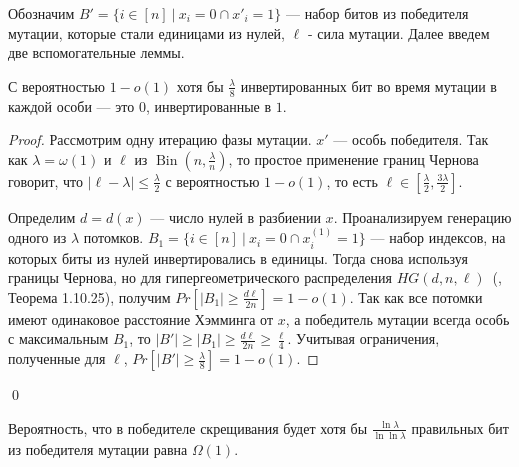 \documentclass[times]{itmo-student-thesis}
\DeclareMathOperator{\Bin}{Bin}
\begin{document}
Обозначим $B' = \{i \in [n] ~|~ x_i = 0 \cap x'_i = 1\}$ --- набор битов из победителя мутации, которые стали единицами из нулей,
$\ell$ - сила мутации. Далее введем две вспомогательные леммы.

\begin{lemma}\label{lem:mut1}
С вероятностью $1- o(1)$ хотя бы $\frac{\lambda}{8}$ инвертированных бит во время мутации в каждой особи --- это $0$, инвертированные в $1$.
\end{lemma}

\begin{proof}
Рассмотрим одну итерацию фазы мутации. $x'$ --- особь победителя.
Так как $\lambda = \omega(1)$ и $\ell$ из $\Bin\left(n, \frac{\lambda}{n}\right)$, то простое применение границ Чернова~\cite{Doerr2011} говорит, что $|\ell - \lambda| \le \frac{\lambda}{2}$ с вероятностью $1- o(1)$, то есть $\ell \in [\frac{\lambda}{2}, \frac{3\lambda}{2}]$.

Определим $d = d(x)$ --- число нулей в разбиении $x$. Проанализируем генерацию одного из $\lambda$ потомков. $B_1 = \{i \in [n] ~|~ x_i = 0 \cap x^{(1)}_i = 1\}$ --- набор индексов, на которых биты из нулей инвертировались в единицы. Тогда снова используя границы Чернова, но для гипергеометрического распределения $HG(d, n, \ell)$~(\cite{Doerr20bookchapter}, Теорема 1.10.25), получим $Pr[|B_1| \ge \frac{d\ell}{2n}] = 1 - o(1)$.
Так как все потомки имеют одинаковое расстояние Хэмминга от $x$, а победитель мутации всегда особь с максимальным $B_1$, то $|B'| \ge |B_1| \ge \frac{d\ell}{2n} \ge \frac{\ell}{4}$. Учитывая ограничения, полученные для $\ell$, $Pr[|B'| \ge \frac{\lambda}{8}] = 1 - o(1)$.
\end{proof}\qed

\begin{lemma}\label{lem:mut2}
Вероятность, что в победителе скрещивания будет хотя бы $\frac{\ln \lambda}{\ln \ln \lambda}$ правильных бит из победителя мутации равна $\Omega(1)$.
\end{lemma}
\end{document}
